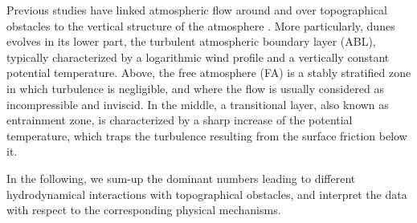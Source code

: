   Previous studies have linked atmospheric flow around and over topographical obstacles to the vertical structure of the atmosphere \citep{Stull1988}. More particularly, dunes evolves in its lower part, the turbulent atmospheric boundary layer (ABL), typically characterized by a logarithmic wind profile and a vertically constant potential temperature. Above, the free atmosphere (FA) is a stably stratified zone in which turbulence is negligible, and where the flow is usually considered as incompressible and inviscid. In the middle, a transitional layer, also known as entrainment zone, is characterized by a sharp increase of the potential temperature, which traps the turbulence resulting from the surface friction below it.

  In the following, we sum-up the dominant numbers leading to different hydrodynamical interactions with topographical obstacles, and interpret the data with respect to the corresponding physical mechanisms.

